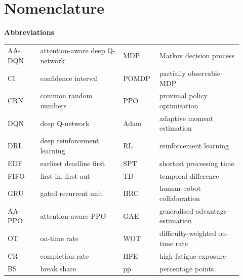 \section*{Nomenclature}
\begingroup
\small\ifdefined\HIGHLIGHT\color{blue}\fi{}
\setlength{\tabcolsep}{4pt}
\noindent\textbf{Abbreviations}\par\smallskip
\noindent\begin{tabular}{@{}p{0.13\linewidth}p{0.33\linewidth}p{0.13\linewidth}p{0.33\linewidth}@{}}
AA-DQN & attention-aware deep Q-network & MDP & Markov decision process \\
CI & confidence interval & POMDP & partially observable MDP \\
CRN & common random numbers & PPO & proximal policy optimisation \\
DQN & deep Q-network & Adam & adaptive moment estimation \\
DRL & deep reinforcement learning & RL & reinforcement learning \\
EDF & earliest deadline first & SPT & shortest processing time \\
FIFO & first in, first out & TD & temporal difference \\
GRU & gated recurrent unit & HRC & human--robot collaboration \\
AA-PPO & attention-aware PPO & GAE & generalised advantage estimation \\
OT & on-time rate & WOT & difficulty-weighted on-time rate \\
CR & completion rate & HFE & high-fatigue exposure \\
BS & break share & pp & percentage points \\
\end{tabular}


